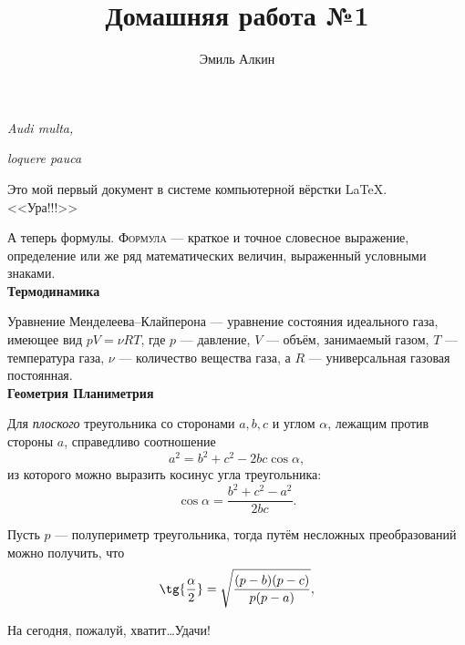 \documentclass[12pt]{article}
\title{Домашняя работа №1}
\author{Эмиль Алкин}
\date{}
\begin{document}
	\maketitle
	\hfill {\itshape Audi multa,} \par
	\hfill {\itshape loquere pauca}
	\vspace{20 pt}
	\begin{center}
		Это мой первый документ в системе компьютерной вёрстки \LaTeX .
		\\[12pt]
		{\sffamily \LARGE <<Ура!!!>>}
	\end{center}
	
	А теперь формулы. {\scshape Формула} --- краткое и точное словесное выражение, определение или же ряд математических величин, выраженный условными знаками.
	\\[15pt]
	\hspace*{28pt} {\bfseries \Large Термодинамика} 
	\par
	Уравнение Менделеева--Клайперона --- уравнение состояния идеального газа, имеющее вид $pV=\nu RT$, где $p$ --- давление, $V$ --- объём, занимаемый газом, $T$ --- температура газа, $\nu$ --- количество вещества газа, а $R$ --- универсальная газовая постоянная.
	\\[15pt]
	\hspace*{28pt}
	{\bfseries \Large Геометрия \hfill Планиметрия}
	\par
	Для {\itshape плоского} треугольника со сторонами $a, b, c$ и углом $\alpha$, лежащим против стороны $a$, справедливо соотношение $$a^2=b^2+c^2-2bc\cos{\alpha},$$ из которого можно выразить косинус угла треугольника: $$\cos{\alpha}=\frac{b^2+c^2-a^2}{2bc}.$$
	
	Пусть $p$ --- полупериметр треугольника, тогда путём несложных преобразований можно получить, что $$\tg{\frac{\alpha}{2}}=\sqrt{\frac{(p-b)(p-c)}{p(p-a)}},$$
	\vspace{1cm}
	\begin{flushleft}
		На сегодня, пожалуй, хватит\dots Удачи!
	\end{flushleft}
\end{document}

